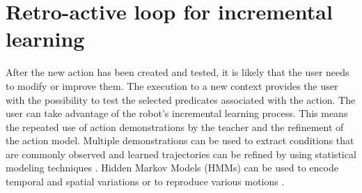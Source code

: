 \section{Retro-active loop for incremental learning}
After the new action has been created and tested, it is likely that the user needs to modify or improve them. The execution to a new context provides the user with the possibility to test the selected predicates associated with the action. The user can take advantage of the robot's incremental learning process. This means the repeated use of action demonstrations by the teacher and the refinement of the action model. Multiple demonstrations can be used to extract conditions that are commonly observed and learned trajectories can be refined by using statistical modeling techniques \cite{ude1993trajectory}.
Hidden Markov Models (HMMs) can be used to encode temporal and spatial variations or to reproduce various motions \cite{tso1996hidden}.
